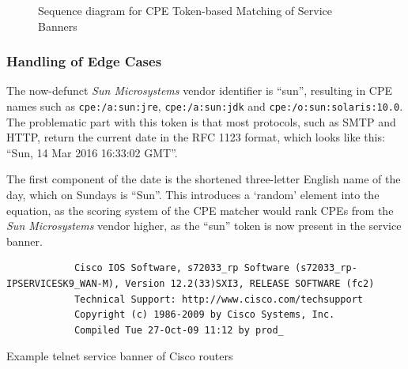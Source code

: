 \documentclass[a4paper,12pt]{article}
\begin{document}
\begin{figure}[!htbp]
		\caption{Sequence diagram for CPE Token-based Matching of Service Banners}
		\label{seqtoken}
	\end{figure}
	
\subsubsection{Handling of Edge Cases} \label{cpeedges}
 

	The now-defunct \textit{Sun Microsystems} vendor identifier is ``sun'', resulting in CPE names such as \texttt{cpe:/a:sun:jre}, \texttt{cpe:/a:sun:jdk} and \texttt{cpe:/o:sun:solaris:10.0}. The problematic part with this token is that most protocols, such as SMTP and HTTP, return the current date in the RFC 1123 format\cite{rfc2616}, which looks like this: ``Sun, 14 Mar 2016 16:33:02 GMT''.
	
	The first component of the date is the shortened three-letter English name of the day, which on Sundays is ``Sun''. This introduces a `random' element into the equation, as the scoring system of the CPE matcher would rank CPEs from the \textit{Sun Microsystems} vendor higher, as the ``sun'' token is now present in the service banner.
	
	\begin{listing}[H]
		\begin{verbatim}
			Cisco IOS Software, s72033_rp Software (s72033_rp-IPSERVICESK9_WAN-M), Version 12.2(33)SXI3, RELEASE SOFTWARE (fc2)
			Technical Support: http://www.cisco.com/techsupport
			Copyright (c) 1986-2009 by Cisco Systems, Inc.
			Compiled Tue 27-Oct-09 11:12 by prod_
		\end{verbatim}
		\caption{Example telnet service banner of Cisco routers}
		\label{ciscosvcbnr}
	\end{listing}
\end{document}
